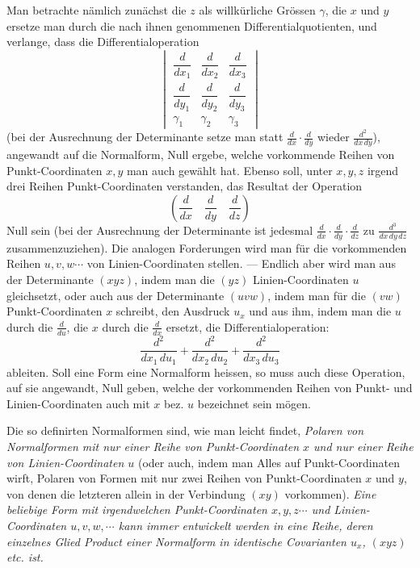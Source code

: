 \documentclass[10pt]{article}
\providecommand{\bdots}{\cdots}
\begin{document}
Man betrachte nämlich zunächst die $z$ als willkürliche Grössen $\gamma$, die $x$ und $y$ ersetze man durch die nach ihnen genommenen Differentialquotienten, und verlange, dass die Differentialoperation
\[
\begin{vmatrix}
\dfrac d{dx_1}&\dfrac d{dx_2}&\dfrac d{dx_3}\\[0.2em]
\dfrac d{dy_1}&\dfrac d{dy_2}&\dfrac d{dy_3}\\[0.2em]
\gamma_1&\gamma_2&\gamma_3
\end{vmatrix}
\]
(bei der Ausrechnung der Determinante setze man statt $\frac d{dx}\cdot\frac d{dy}$ wieder $\frac{d^2}{dx\,dy}$), angewandt auf die Normalform, Null ergebe, welche vorkommende Reihen von Punkt-Coordinaten $x,y$ man auch gewählt hat. Ebenso soll, unter $x,y,z$ irgend drei Reihen Punkt-Coordinaten verstanden, das Resultat der Operation
\[
\left(\frac d{dx}\quad\frac d{dy}\quad\frac d{dz}\right)
\]
Null sein (bei der Ausrechnung der Determinante ist jedesmal $\frac d{dx}\cdot\frac d{dy}\cdot\frac d{dz}$ zu $\frac{d^3}{dx\,dy\,dz}$ zusammenzuziehen). Die analogen Forderungen wird man für die vorkommenden Reihen $u,v,w\bdots$ von Linien-Coordinaten stellen. --- Endlich aber wird man aus der Determinante $(xyz)$, indem man die $(yz)$ Linien-Coordinaten $u$ gleichsetzt, oder auch aus der Determinante $(uvw)$, indem man für die $(vw)$ Punkt-Coordinaten $x$ schreibt, den Ausdruck $u_x$ und aus ihm, indem man die $u$ durch die $\frac d{du}$, die $x$ durch die $\frac d{dx}$ ersetzt, die Differentialoperation:
\[
\frac{d^2}{dx_1\,du_1}+\frac{d^2}{dx_2\,du_2}+\frac{d^2}{dx_3\,du_3}
\]
ableiten. Soll eine Form eine Normalform heissen, so muss auch diese Operation, auf sie angewandt, Null geben, welche der vorkommenden Reihen von Punkt- und Linien-Coordinaten auch mit $x$ bez. $u$ bezeichnet sein mögen.

Die so definirten Normalformen sind, wie man leicht findet, \textit{Polaren von Normalformen mit nur einer Reihe von Punkt-Coordinaten $x$ und nur einer Reihe von Linien-Coordinaten $u$} (oder auch, indem man Alles auf Punkt-Coordinaten wirft, Polaren von Formen mit nur zwei Reihen von Punkt-Coordinaten $x$ und $y$, von denen die letzteren allein in der Verbindung $(xy)$ vorkommen). \textit{Eine beliebige Form mit irgendwelchen Punkt-Coordinaten $x,y,z\bdots$ und Linien-Coordinaten $u,v,w,\bdots$ kann immer entwickelt werden in eine Reihe, deren einzelnes Glied Product einer Normalform in identische Covarianten $u_x$, $(xyz)$ etc. ist.}
\end{document}
